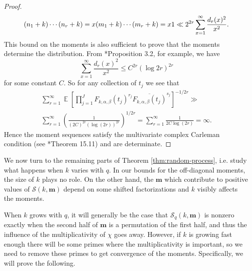\documentclass[12pt, a4paper]{amsart}
\theoremstyle{remark}
\newcommand{\bm}{\mathbf{m}}
\newcommand{\cS}{\mathcal{S}}
\DeclareMathOperator{\E}{\mathbb{E}}
\begin{document}
\begin{proof}
\begin{equation}
{{        \\ (n_1 + k)\cdots(n_r + k) = x \\ (m_1 + k)\cdots(m_r + k) = x }}
        1
        \ll 2^{2r} \sum_{x=1}^\infty \frac{d_r(x)^2}{x^2}.
\end{equation}
This bound on the moments is also sufficient to prove that the moments
determine the distribution. From \cite{BG-maximum}*{Proposition 3.2},
for example, we have
\[
    \sum_{x=1}^\infty \frac{d_r(x)^2}{x^2} \le C^{2r}(\log 2r)^{2r}
\]
for some constant $C$. So for any collection of $t_j$ we see that
\begin{multline*}
    \sum_{r=1}^\infty \E \left[ \prod_{j=1}^J F_{k,\alpha,\beta}(t_j)^{r_j} \overline{F_{k,\alpha,\beta}(t_j)}^{s_j} \right]^{-1/2r}
    \gg \\
    \sum_{r=1}^\infty \left(\frac{1}{(2C)^{2r} (\log (2r) )^{2r}}\right)^{1/2r}
    = \sum_{r=1}^\infty \frac{1}{2C \log(2r)} = \infty.
\end{multline*}
Hence the moment sequences satisfy the multivariate complex
Carleman condition (see \cite{moment-problem}*{Theorem 15.11}) and are determinate.
\end{proof}


We now turn to the remaining parts of Theorem \ref{thm:random-process}, i.e. study what happens when $k$ varies with $q$. In our bounds for the 
off-diagonal moments, the size of $k$ plays no role. On the other hand, the
$\bm$ which contribute to positive values of $\cS(k, \bm)$ depend on some
shifted factorizations and $k$ visibly affects the moments.

When $k$ grows with $q$, it will generally
be the case that $\cS_q(k, \bm)$ is nonzero exactly
when the second half of $\bm$ is a permutation of the first half, and
thus the influence of the multiplicativity of $\chi$ goes away.
However, if $k$ is growing fast enough there will be some primes
where the multiplicativity is important, so we need to remove these primes
to get convergence of the moments. Specifically, we will prove the following.
\end{document}
